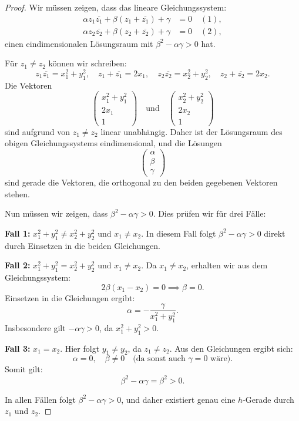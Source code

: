 \documentclass[a4paper,12pt]{article}
\theoremstyle{break}
\begin{document}
\begin{proof}
Wir müssen zeigen, dass das lineare Gleichungssystem:
\[
\begin{aligned}
    \alpha z_1 \overline{z_1} + \beta (z_1 + \overline{z_1}) + \gamma &= 0 \quad (1), \\
    \alpha z_2 \overline{z_2} + \beta (z_2 + \overline{z_2}) + \gamma &= 0 \quad (2),
\end{aligned}
\]
einen eindimensionalen Lösungsraum mit \(\beta^2 - \alpha \gamma > 0\) hat.

Für \(z_1 \neq z_2\) können wir schreiben:
\[
z_1 \overline{z_1} = x_1^2 + y_1^2, \quad z_1 + \overline{z_1} = 2x_1, \quad z_2 \overline{z_2} = x_2^2 + y_2^2, \quad z_2 + \overline{z_2} = 2x_2.
\]
Die Vektoren 
\[
\begin{pmatrix} x_1^2 + y_1^2 \\ 2x_1 \\ 1 \end{pmatrix}
\quad \text{und} \quad
\begin{pmatrix} x_2^2 + y_2^2 \\ 2x_2 \\ 1 \end{pmatrix}
\]
sind aufgrund von \(z_1 \neq z_2\) linear unabhängig. Daher ist der Lösungsraum des obigen Gleichungssystems eindimensional, und die Lösungen 
\[
\begin{pmatrix} \alpha \\ \beta \\ \gamma \end{pmatrix}
\]
sind gerade die Vektoren, die orthogonal zu den beiden gegebenen Vektoren stehen.

Nun müssen wir zeigen, dass \(\beta^2 - \alpha \gamma > 0\). Dies prüfen wir für drei Fälle:

\textbf{Fall 1:} \(x_1^2 + y_1^2 \neq x_2^2 + y_2^2\) und \(x_1 \neq x_2\).  
In diesem Fall folgt \(\beta^2 - \alpha \gamma > 0\) direkt durch Einsetzen in die beiden Gleichungen.

\textbf{Fall 2:} \(x_1^2 + y_1^2 = x_2^2 + y_2^2\) und \(x_1 \neq x_2\).  
Da \(x_1 \neq x_2\), erhalten wir aus dem Gleichungssystem:
\[
2\beta (x_1 - x_2) = 0 \implies \beta = 0.
\]
Einsetzen in die Gleichungen ergibt:
\[
\alpha = -\frac{\gamma}{x_1^2 + y_1^2}.
\]
Insbesondere gilt \(-\alpha \gamma > 0\), da \(x_1^2 + y_1^2 > 0\).

\textbf{Fall 3:} \(x_1 = x_2\).  
Hier folgt \(y_1 \neq y_2\), da \(z_1 \neq z_2\). Aus den Gleichungen ergibt sich:
\[
\alpha = 0, \quad \beta \neq 0 \quad \text{(da sonst auch \(\gamma = 0\) wäre)}.
\]
Somit gilt:
\[
\beta^2 - \alpha \gamma = \beta^2 > 0.
\]

In allen Fällen folgt \(\beta^2 - \alpha \gamma > 0\), und daher existiert genau eine \(h\)-Gerade durch \(z_1\) und \(z_2\).
\end{proof}
\end{document}
